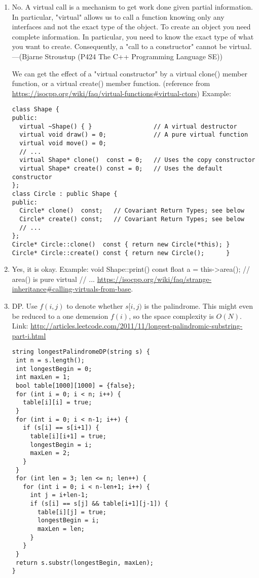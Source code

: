 \documentclass[10pt]{article}
\begin{document}
\begin{enumerate}
\item %
No. A virtual call is a mechanism to get work done given partial information. In particular, "virtual" allows us to call a function knowing only any interfaces and not the exact type of the object. To create an object you need complete information. In particular, you need to know the exact type of what you want to create. Consequently, a "call to a constructor" cannot be virtual.
---(Bjarne Stroustup (P424 The C++ Programming Language SE))

We can get the effect of a "virtual constructor" by a virtual clone() member function, or a virtual create() member function.
(reference from \url{https://isocpp.org/wiki/faq/virtual-functions#virtual-ctors})
Example:
\begin{lstlisting}
class Shape {
public:
  virtual ~Shape() { }                 // A virtual destructor
  virtual void draw() = 0;             // A pure virtual function
  virtual void move() = 0;
  // ...
  virtual Shape* clone()  const = 0;   // Uses the copy constructor
  virtual Shape* create() const = 0;   // Uses the default constructor
};
class Circle : public Shape {
public:
  Circle* clone()  const;   // Covariant Return Types; see below
  Circle* create() const;   // Covariant Return Types; see below
  // ...
};
Circle* Circle::clone()  const { return new Circle(*this); }
Circle* Circle::create() const { return new Circle();      }
\end{lstlisting}

\item %
Yes, it is okay.
Example:
void Shape::print() const{
    float a = this->area();  // area() is pure virtual
    // ...
}
 \url{https://isocpp.org/wiki/faq/strange-inheritance#calling-virtuals-from-base}.

\item %
DP. Use $f(i,j)$ to denote whether $s[i,j)$ is the palindrome. This might even be reduced to a one demension $f(i)$, so the space complexity is $O(N)$. Link: \url{http://articles.leetcode.com/2011/11/longest-palindromic-substring-part-i.html}

\begin{lstlisting}
string longestPalindromeDP(string s) {
 int n = s.length();
 int longestBegin = 0;
 int maxLen = 1;
 bool table[1000][1000] = {false};
 for (int i = 0; i < n; i++) {
   table[i][i] = true;
 }
 for (int i = 0; i < n-1; i++) {
   if (s[i] == s[i+1]) {
     table[i][i+1] = true;
     longestBegin = i;
     maxLen = 2;
   }
 }
 for (int len = 3; len <= n; len++) {
   for (int i = 0; i < n-len+1; i++) {
     int j = i+len-1;
     if (s[i] == s[j] && table[i+1][j-1]) {
       table[i][j] = true;
       longestBegin = i;
       maxLen = len;
     }
   }
 }
 return s.substr(longestBegin, maxLen);
}
\end{lstlisting}


\end{enumerate}
\end{document}
